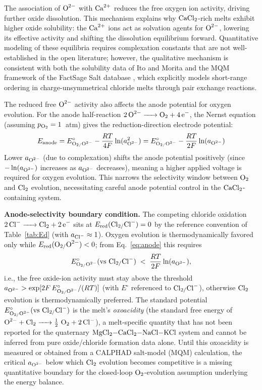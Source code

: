 \documentclass[pdflatex,sn-basic,Numbered]{sn-jnl}
\begin{document}
The association of $\ce{O^{2-}}$ with $\ce{Ca^{2+}}$ reduces the free oxygen ion activity, driving further oxide dissolution. This mechanism explains why $\ce{CaCl2}$-rich melts exhibit higher oxide solubility: the $\ce{Ca^{2+}}$ ions act as solvation agents for $\ce{O^{2-}}$, lowering its effective activity and shifting the dissolution equilibrium forward. Quantitative modeling of these equilibria requires complexation constants that are not well-established in the open literature; however, the qualitative mechanism is consistent with both the solubility data of Ito and Morita \cite{morita2004} and the MQM framework of the FactSage Salt database \cite{pelton2000mqm}, which explicitly models short-range ordering in charge-unsymmetrical chloride melts through pair exchange reactions.

The reduced free $\ce{O^{2-}}$ activity also affects the anode potential for oxygen evolution. For the anode half-reaction $\ce{2O^{2-} -> O2 + 4e^-}$, the Nernst equation (assuming $p_{\ce{O2}} = 1$~atm) gives the reduction-direction electrode potential:
\begin{equation}
\label{eq:anode}
E_{\mathrm{anode}} = E^{\circ}_{\ce{O2/O^{2-}}} - \frac{RT}{4F}\ln(a_{\ce{O^{2-}}}^2) = E^{\circ}_{\ce{O2/O^{2-}}} - \frac{RT}{2F}\ln(a_{\ce{O^{2-}}})
\end{equation}
Lower $a_{\ce{O^{2-}}}$ (due to complexation) shifts the anode potential positively (since $-\ln(a_{\ce{O^{2-}}})$ increases as $a_{\ce{O^{2-}}}$ decreases), meaning a higher applied voltage is required for oxygen evolution. This narrows the selectivity window between $\ce{O2}$ and $\ce{Cl2}$ evolution, necessitating careful anode potential control in the $\ce{CaCl2}$-containing system.

\textbf{Anode-selectivity boundary condition.} The competing chloride oxidation $\ce{2Cl^- -> Cl2 + 2e^-}$ sits at $E_{\mathrm{red}}(\ce{Cl2/Cl^-}) = 0$ by the reference convention of Table~\ref{tab:Ed} (with $a_{\ce{Cl^-}} \approx 1$). Oxygen evolution is thermodynamically favored only while $E_{\mathrm{red}}(\ce{O2/O^{2-}}) < 0$; from Eq.~\ref{eq:anode} this requires
\begin{equation}
E^{\circ}_{\ce{O2/O^{2-}}}(\mathrm{vs}~\ce{Cl2/Cl^-}) \;<\; \frac{RT}{2F}\ln(a_{\ce{O^{2-}}}),
\end{equation}
i.e., the free oxide-ion activity must stay above the threshold $a_{\ce{O^{2-}}} > \exp[2F\,E^{\circ}_{\ce{O2/O^{2-}}}/(RT)]$ (with $E^{\circ}$ referenced to $\ce{Cl2/Cl^-}$), otherwise $\ce{Cl2}$ evolution is thermodynamically preferred. The standard potential $E^{\circ}_{\ce{O2/O^{2-}}}(\mathrm{vs}~\ce{Cl2/Cl^-})$ is the melt's \emph{oxoacidity} (the standard free energy of $\ce{O^{2-} + Cl2 -> 1/2\,O2 + 2Cl^-}$), a melt-specific quantity that has not been reported for the quaternary $\ce{MgCl2-CaCl2-NaCl-KCl}$ system and cannot be inferred from pure oxide/chloride formation data alone. Until this oxoacidity is measured or obtained from a CALPHAD salt-model (MQM) calculation, the critical $a_{\ce{O^{2-}}}$ below which $\ce{Cl2}$ evolution becomes competitive is a missing quantitative boundary for the closed-loop $\ce{O2}$-evolution assumption underlying the energy balance.
\end{document}
